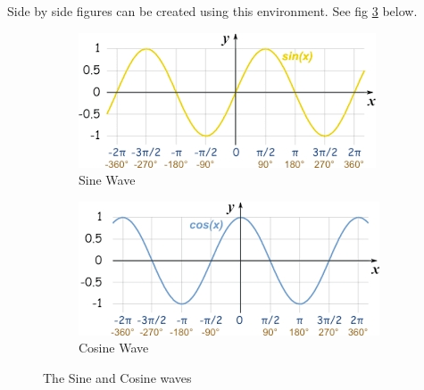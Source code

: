 \noindent Side by side figures can be created using this environment. See fig \ref{wave} below.
\begin{figure}[h!]
	\centering
	\begin{subfigure}[b]{0.4\textwidth}
		\includegraphics[width=\textwidth]{sinewave}
		\caption{Sine Wave}
		\label{fig:1}
	\end{subfigure}
	\hspace{20mm}
	\begin{subfigure}[b]{0.4\textwidth}
		\includegraphics[width=\linewidth]{cosine}
		\caption{Cosine Wave}
		\label{fig:2}
	\end{subfigure}
\caption{The Sine and Cosine waves}
\label{wave}
\end{figure}
